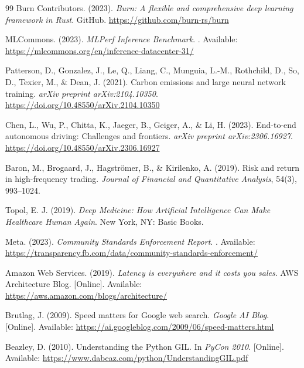 \documentclass[10pt,twocolumn,a4paper]{article}
\theoremstyle{definition}
\theoremstyle{plain}
\begin{document}
\begin{thebibliography}{99}
Burn Contributors. (2023).
\newblock \textit{Burn: A flexible and comprehensive deep learning framework in Rust}.
\newblock GitHub. \url{https://github.com/burn-rs/burn}

MLCommons. (2023).
\newblock \textit{MLPerf Inference Benchmark}.
\newblock [Online]. Available: \url{https://mlcommons.org/en/inference-datacenter-31/}

Patterson, D., Gonzalez, J., Le, Q., Liang, C., Munguia, L.-M., Rothchild, D., So, D., Texier, M., \& Dean, J. (2021).
\newblock Carbon emissions and large neural network training.
\newblock \textit{arXiv preprint arXiv:2104.10350}. \url{https://doi.org/10.48550/arXiv.2104.10350}

Chen, L., Wu, P., Chitta, K., Jaeger, B., Geiger, A., \& Li, H. (2023).
\newblock End-to-end autonomous driving: Challenges and frontiers.
\newblock \textit{arXiv preprint arXiv:2306.16927}. \url{https://doi.org/10.48550/arXiv.2306.16927}

Baron, M., Brogaard, J., Hagstr\"{o}mer, B., \& Kirilenko, A. (2019).
\newblock Risk and return in high-frequency trading.
\newblock \textit{Journal of Financial and Quantitative Analysis}, 54(3), 993--1024.

Topol, E. J. (2019).
\newblock \textit{Deep Medicine: How Artificial Intelligence Can Make Healthcare Human Again}.
\newblock New York, NY: Basic Books.

Meta. (2023).
\newblock \textit{Community Standards Enforcement Report}.
\newblock [Online]. Available: \url{https://transparency.fb.com/data/community-standards-enforcement/}

Amazon Web Services. (2019).
\newblock \textit{Latency is everywhere and it costs you sales}.
\newblock AWS Architecture Blog. [Online]. Available: \url{https://aws.amazon.com/blogs/architecture/}

Brutlag, J. (2009).
\newblock Speed matters for Google web search.
\newblock \textit{Google AI Blog}. [Online]. Available: \url{https://ai.googleblog.com/2009/06/speed-matters.html}

Beazley, D. (2010).
\newblock Understanding the Python GIL.
\newblock In \textit{PyCon 2010}. [Online]. Available: \url{https://www.dabeaz.com/python/UnderstandingGIL.pdf}


\end{thebibliography}
\end{document}
